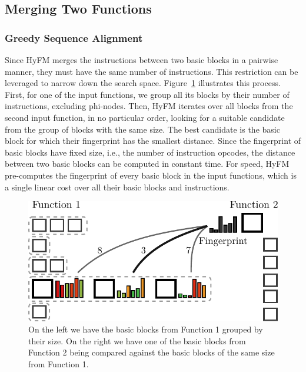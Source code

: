 \subsection{Merging Two Functions}


\subsubsection{Greedy Sequence Alignment}

Since HyFM merges the instructions between two basic blocks in a pairwise manner, they must have the same number of instructions.
This restriction can be leveraged to narrow down the search space.
Figure~\ref{fig:hyfm-alignment-1} illustrates this process.
First, for one of the input functions, we group all its blocks by their number of instructions, excluding phi-nodes.
Then, HyFM iterates over all blocks from the second input function, in no particular order, looking for a suitable candidate from the group of blocks with the same size.
The best candidate is the basic block for which their fingerprint has the smallest distance.
Since the fingerprint of basic blocks have fixed size, i.e., the number of instruction opcodes, the distance between two basic blocks can be computed in constant time.
For speed, HyFM pre-computes the fingerprint of every basic block in the input functions, which is a single linear cost over all their basic blocks and instructions.


\begin{figure}[h]
  \centering
  \includegraphics[scale=0.8]{src/fastfm/figs/hyfm-alignment-1.pdf}
  \caption{On the left we have the basic blocks from Function 1 grouped by their size. On the right we have one of the basic blocks from Function 2 being compared against the basic blocks of the same size from Function 1.}
  \label{fig:hyfm-alignment-1}
\end{figure}


